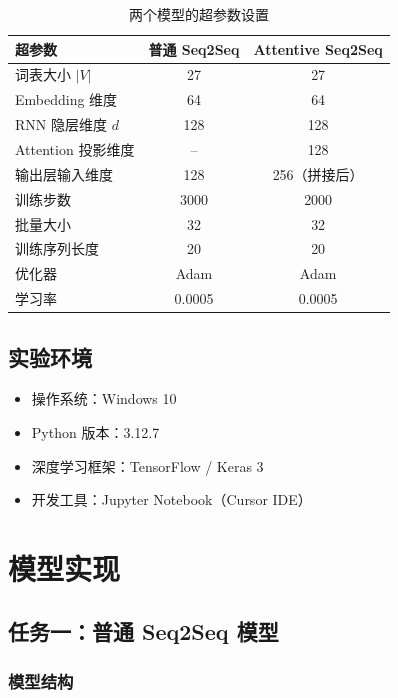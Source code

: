 \documentclass[12pt, a4paper]{article}
\begin{document}
\begin{table}[H]
    \centering
    \caption{两个模型的超参数设置}
    \begin{tabular}{lcc}
        \toprule
        超参数 & 普通 Seq2Seq & Attentive Seq2Seq \\
        \midrule
        词表大小 $|V|$ & 27 & 27 \\
        Embedding 维度 & 64 & 64 \\
        RNN 隐层维度 $d$ & 128 & 128 \\
        Attention 投影维度 & -- & 128 \\
        输出层输入维度 & 128 & 256（拼接后）\\
        训练步数 & 3000 & 2000 \\
        批量大小 & 32 & 32 \\
        训练序列长度 & 20 & 20 \\
        优化器 & Adam & Adam \\
        学习率 & 0.0005 & 0.0005 \\
        \bottomrule
    \end{tabular}
\end{table}

\subsection{实验环境}

\begin{itemize}
    \item 操作系统：Windows 10
    \item Python 版本：3.12.7
    \item 深度学习框架：TensorFlow / Keras 3
    \item 开发工具：Jupyter Notebook（Cursor IDE）
\end{itemize}

\section{模型实现}

\subsection{任务一：普通 Seq2Seq 模型}

\subsubsection{模型结构}
\end{document}
